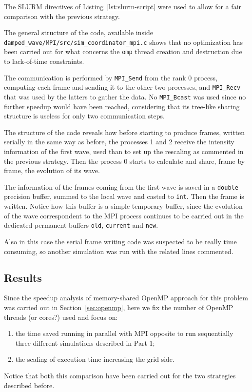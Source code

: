 The SLURM directives of Listing~\ref{lst:slurm-script} were used to allow for
a fair comparison with the previous strategy.

The general structure of the code, available inside
\lstinline[language=bash,
  basicstyle=\ttfamily\color{black},
  identifierstyle=\color{black},
  keywordstyle=\color{black},
  commentstyle=\color{black},
  stringstyle=\color{black},
  numberstyle=\color{black},
]|damped_wave/MPI/src/sim_coordinator_mpi.c| shows that no optimization
has been carried out for what concerns the \texttt{omp} thread
creation and destruction
due to lack-of-time constraints.

The communication is performed by \texttt{MPI\_Send}
from the rank 0 process, computing each frame and sending it to the
other two processes, and \texttt{MPI\_Recv} that was used by the latters
to gather the data. No \texttt{MPI\_Bcast} was used since no further
speedup would
have been reached, considering that its tree-like sharing structure is useless
for only two communication steps.

The structure of the code reveals how before starting to produce
frames, written serially
in the same way as before, the  processes 1 and 2 receive the
intensity information
of the first wave, used than to set up the rescaling as commented in
the previous strategy. Then the process 0 starts to calculate and
share, frame by frame,
the evolution of its wave.

The information of the frames coming from the first wave is saved in a
\texttt{double} precision buffer, summed to the local wave and casted
to \texttt{int}.
Then the frame is written. Notice how this buffer is a simple
temporary buffer, since
the evolution of the wave correspondent to the MPI process continues
to be carried out
in the dedicated permanent buffers  \texttt{old}, \texttt{current}
and \texttt{new}.

Also in this case the serial frame writing code was suspected to be really time
consuming, so another simulation
was run with the related lines commented.


\subsection{Results}
Since the speedup analysis of memory-shared OpenMP approach for
this problem was carried out in
Section~\ref{sec:openmp}, here we fix the number of OpenMP threads
(or cores?) used and focus on:
\begin{enumerate}
  \item the time saved running in parallel with MPI opposite to run
    sequentially three different simulations described in Part 1;
  \item the scaling of execution time increasing the grid side.
\end{enumerate}
Notice that both this comparison have been carried out for the two strategies
described before.

